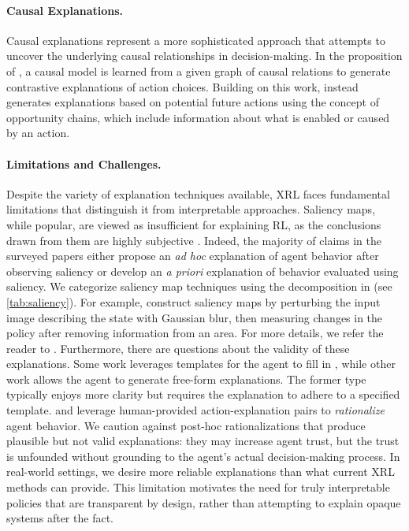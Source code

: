 \paragraph{Causal Explanations.}
Causal explanations represent a more sophisticated approach that attempts to uncover the underlying causal relationships in decision-making. In the proposition of \cite{madumal_explainable_2020}, a causal model is learned from a given graph of causal relations to generate contrastive explanations of action choices. Building on this work, \cite{madumal_distal_2020} instead generates explanations based on potential future actions using the concept of opportunity chains, which include information about what is enabled or caused by an action.

\paragraph{Limitations and Challenges.}
Despite the variety of explanation techniques available, XRL faces fundamental limitations that distinguish it from interpretable approaches. Saliency maps, while popular, are viewed as insufficient for explaining RL, as the conclusions drawn from them are highly subjective \cite{atrey2019exploratory}. Indeed, the majority of claims in the surveyed papers either propose an \textit{ad hoc} explanation of agent behavior after observing saliency or develop an \textit{a priori} explanation of behavior evaluated using saliency.
We categorize saliency map techniques using the decomposition in \cite{atrey2019exploratory} (see \ref{tab:saliency}). For example, \cite{greydanus2018visualizing} construct saliency maps by perturbing the input image describing the state with Gaussian blur, then measuring changes in the policy after removing information from an area. For more details, we refer the reader to \cite{atrey2019exploratory}.
Furthermore, there are questions about the validity of these explanations. Some work leverages templates for the agent to fill in \cite{ImpRoboticController}, while other work allows the agent to generate free-form explanations. The former type typically enjoys more clarity but requires the explanation to adhere to a specified template. \cite{frogger} and \cite{wang2019verbalexplanations} leverage human-provided action-explanation pairs to \textit{rationalize} agent behavior. We caution against post-hoc rationalizations that produce plausible but not valid explanations: they may increase agent trust, but the trust is unfounded without grounding to the agent's actual decision-making process.
In real-world settings, we desire more reliable explanations than what current XRL methods can provide. This limitation motivates the need for truly interpretable policies that are transparent by design, rather than attempting to explain opaque systems after the fact.



